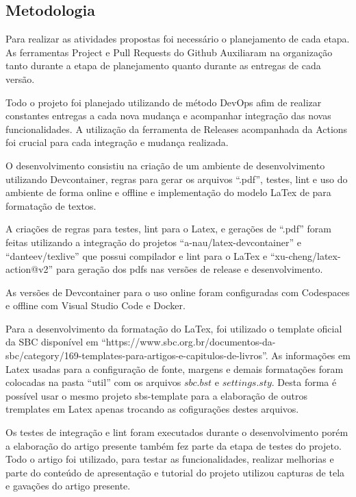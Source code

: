 \subsection{Metodologia}

Para realizar as atividades propostas foi necessário o planejamento de cada etapa. As ferramentas Project e Pull Requests do Github Auxiliaram na organização tanto durante a etapa de planejamento quanto durante as entregas de cada versão.

Todo o projeto foi planejado utilizando de método DevOps afim de realizar constantes entregas a cada nova mudança e acompanhar integração das novas funcionalidades. A utilização da ferramenta de Releases acompanhada da Actions foi crucial para cada integração e mudança realizada.


O desenvolvimento consistiu na criação de um ambiente de desenvolvimento utilizando Devcontainer, regras para gerar os arquivos ``.pdf'', testes, lint e uso do ambiente de forma online e offline e implementação do modelo LaTex de para formatação de textos.


A criações de regras para testes, lint para o Latex, e gerações de ``.pdf'' foram feitas utilizando a integração do projetos ``a-nau/latex-devcontainer'' e ``danteev/texlive'' que possui compilador e lint para o LaTex e ``xu-cheng/latex-action@v2'' para geração dos pdfs nas versões de release e desenvolvimento.

As versões de Devcontainer para o uso online foram configuradas com Codespaces e offline com Visual Studio Code e Docker.

Para a desenvolvimento da formatação do LaTex, foi utilizado o template oficial da SBC disponível em ``https://www.sbc.org.br/documentos-da-sbc/category/169-templates-para-artigos-e-capitulos-de-livros''. As informações em Latex usadas para a configuração de fonte, margens e demais formatações foram colocadas na pasta ``util'' com os arquivos $sbc.bst$ e $settings.sty$. Desta forma é possível usar o mesmo projeto sbs-template para a elaboração de outros tremplates em Latex apenas trocando as cofigurações destes arquivos.

Os testes de integração e lint foram executados durante o desenvolvimento porém a elaboração do artigo presente também fez parte da etapa de testes do projeto. Todo o artigo foi utilizado, para testar as funcionalidades, realizar melhorias e parte do conteúdo de apresentação e tutorial do projeto utilizou capturas de tela e gavações do artigo presente.